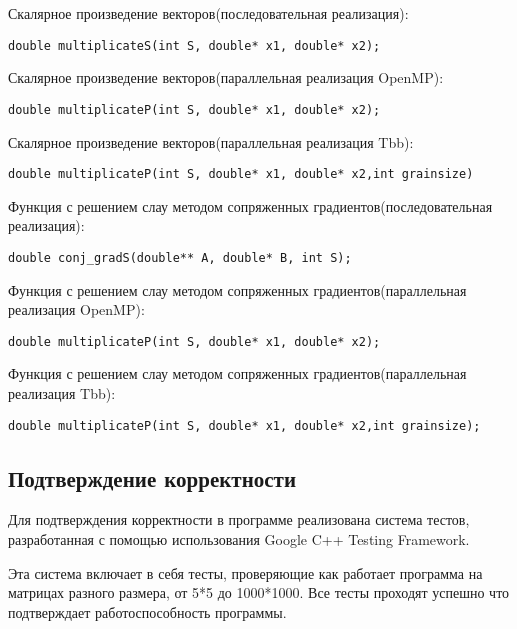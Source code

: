 \documentclass{report}
\begin{document}
\par Скалярное произведение векторов(последовательная реализация):
\begin{lstlisting}
double multiplicateS(int S, double* x1, double* x2);
\end{lstlisting}
\par Скалярное произведение векторов(параллельная реализация OpenMP):
\begin{lstlisting}
double multiplicateP(int S, double* x1, double* x2);
\end{lstlisting}
\par Скалярное произведение векторов(параллельная реализация Tbb):
\begin{lstlisting}
double multiplicateP(int S, double* x1, double* x2,int grainsize)
\end{lstlisting}
\par Функция с решением слау методом сопряженных градиентов(последовательная реализация):
\begin{lstlisting}
double conj_gradS(double** A, double* B, int S);
\end{lstlisting}
\par Функция с решением слау методом сопряженных градиентов(параллельная реализация OpenMP):
\begin{lstlisting}
double multiplicateP(int S, double* x1, double* x2);
\end{lstlisting}
\par Функция с решением слау методом сопряженных градиентов(параллельная реализация Tbb):
\begin{lstlisting}
double multiplicateP(int S, double* x1, double* x2,int grainsize);
\end{lstlisting}

\newpage

\begin{center}
\section*{Подтверждение корректности}
\end{center}
\par Для подтверждения корректности в программе реализована система тестов, разработанная с помощью использования Google C++ Testing Framework.
\par Эта система включает в себя тесты, проверяющие как работает программа на матрицах разного размера, от 5*5 до 1000*1000. Все тесты проходят успешно что подтверждает работоспособность программы.
\newpage
\end{document}
